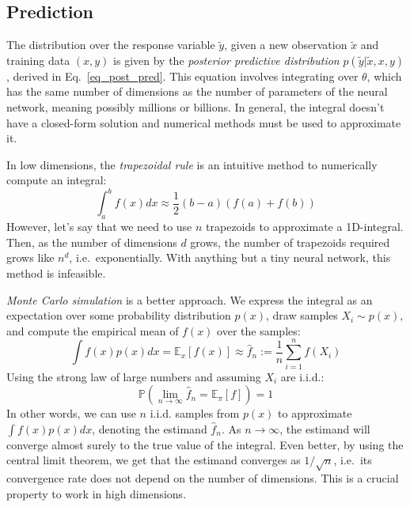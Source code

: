 \documentclass[12pt]{article}
\begin{document}
\subsection{Prediction}
\label{sec_prediction}

The distribution over the response variable $\tilde{y}$, given a new observation $\tilde{x}$ and training data $(x, y)$ is given by the \textit{posterior predictive distribution} $p(\tilde{y} | \tilde{x}, x, y)$, derived in Eq.\ \ref{eq_post_pred}. This equation involves integrating over $\theta$, which has the same number of dimensions as the number of parameters of the neural network, meaning possibly millions or billions. In general, the integral doesn't have a closed-form solution and numerical methods must be used to approximate it.

In low dimensions, the \textit{trapezoidal rule} is an intuitive method to numerically compute an integral:
\begin{equation}
\int_{a}^{b} f(x) d x \approx \frac{1}{2}(b-a)(f(a)+f(b))
\end{equation}
However, let's say that we need to use $n$ trapezoids to approximate a 1D-integral. Then, as the number of dimensions $d$ grows, the number of trapezoids required grows like $n^d$, i.e.\ exponentially. With anything but a tiny neural network, this method is infeasible.

\textit{Monte Carlo simulation} is a better approach. We express the integral as an expectation over some probability distribution $p(x)$, draw samples $X_i \sim p(x)$, and compute the empirical mean of $f(x)$ over the samples:
\begin{equation}
\int f(x)p(x) dx = \mathbb{E}_x[f(x)] \approx \hat{f}_n := \frac{1}{n} \sum_{i=1}^n f(X_i)
\end{equation}
Using the strong law of large numbers and assuming $X_i$ are i.i.d.:
\begin{equation}
\mathbb{P}\left(\lim_{n \rightarrow \infty} \hat{f}_n = \mathbb{E}_{\pi}[f]\right)=1
\end{equation}
In other words, we can use $n$ i.i.d. samples from $p(x)$ to approximate $\int f(x)p(x) dx$, denoting the estimand $\hat{f}_n$. As $n \rightarrow \infty$, the estimand will converge almost surely to the true value of the integral. Even better, by using the central limit theorem, we get that the estimand converges as $1/\sqrt n$, i.e.\, its convergence rate does not depend on the number of dimensions. This is a crucial property to work in high dimensions.
\end{document}
